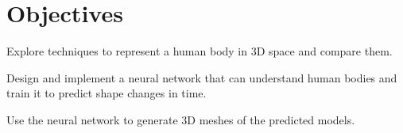 
\chapter{Objectives}\label{objectives}

Explore techniques to represent a human body in 3D space and compare them.

Design and implement a neural network that can understand human bodies and
train it to predict shape changes in time.

Use the neural network to generate 3D meshes of the predicted models.

